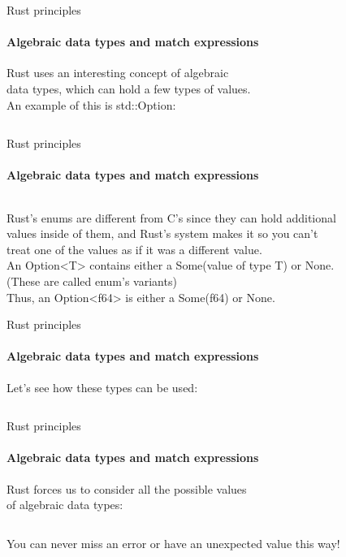 \documentclass[usenames,dvipsnames,10pt,aspectratio=169]{beamer}
\begin{document}
\begin{frame}{Rust principles}
\framesubtitle{Algebraic data types and match expressions}
\large
Rust uses an interesting concept of algebraic \\
data types, which can hold a few types of values.\\ 
An example of this is \textcolor{ucuyellow}{std::Option}:\\
\vspace{0.2cm}
\inputminted[fontsize=\Large]{rust}{code/option1.rs}
\vspace{0.4cm}
\end{frame}

\begin{frame}{Rust principles}
\framesubtitle{Algebraic data types and match expressions}
\large
\inputminted[fontsize=\large]{rust}{code/option1.rs}
\vspace{0.4cm}
\normalsize
Rust's \textcolor{ucuyellow}{enum}s are different from C's since they can hold additional\\
values inside of them, and Rust's system makes it so you can't\\
treat one of the values as if it was a different value.\\

\vspace{0.2cm}
An \textcolor{ucuyellow}{Option<T>}
contains either a \textcolor{ucuyellow}{Some(value of type T)}
or \textcolor{ucuyellow}{None}.\\
(These are called enum's variants)\\

Thus, an \textcolor{ucuyellow}{Option<f64>}
is either a \textcolor{ucuyellow}{Some(f64)}
or \textcolor{ucuyellow}{None}.
\end{frame}
\begin{frame}{Rust principles}
\framesubtitle{Algebraic data types and match expressions}
\large	
Let's see how these types can be used:
\vspace{0.2cm}
\inputminted[fontsize=\large]{rust}{code/option2.rs}
\end{frame}

\begin{frame}{Rust principles}
\framesubtitle{Algebraic data types and match expressions}
\large
Rust forces us to consider all the possible values\\
of algebraic data types:
\vspace{0.3cm}
\inputminted[fontsize=\large]{rust}{code/option3.rs}
\vspace{0.3cm}
You can never miss an error or have an unexpected value this way!
\vspace{0.4cm}
\end{frame}
\end{document}
